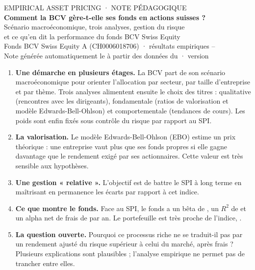 \documentclass[11pt,a4paper]{article}
\begin{document}
\begin{center}
  {\small\color{gris} EMPIRICAL ASSET PRICING · NOTE PÉDAGOGIQUE}\\[6pt]
  {\LARGE\bfseries Comment la BCV gère-t-elle ses fonds en actions suisses ?}\\[4pt]
  {\large Scénario macroéconomique, trois analyses, gestion du risque\\et ce qu'en dit la performance du fonds BCV Swiss Equity}\\[8pt]
  {\small Fonds BCV Swiss Equity A (CH0006018706) · résultats empiriques \PeriodeDebut{} – \PeriodeFin{}}\\[2pt]
  {\small\color{gris} Note générée automatiquement le \DateRapport{} à partir des données du \DateDonnees{} · version \texttt{\Commit}}
\end{center}

\vspace{4pt}

\begin{essentiel}
\begin{enumerate}[leftmargin=*,label=\textbf{\arabic*.}]
  \item \textbf{Une démarche en plusieurs étages.} La BCV part de son scénario macroéconomique pour orienter l'allocation par secteur, par taille d'entreprise et par thème. Trois analyses alimentent ensuite le choix des titres : qualitative (rencontres avec les dirigeants), fondamentale (ratios de valorisation et modèle Edwards-Bell-Ohlson) et comportementale (tendances de cours). Les poids sont enfin fixés sous contrôle du risque par rapport au SPI.
  \item \textbf{La valorisation.} Le modèle Edwards-Bell-Ohlson (EBO) estime un prix théorique : une entreprise vaut plus que ses fonds propres si elle gagne davantage que le rendement exigé par ses actionnaires. Cette valeur est très sensible aux hypothèses.
  \item \textbf{Une gestion « relative ».} L'objectif est de battre le SPI à long terme en maîtrisant en permanence les écarts par rapport à cet indice.
  \item \textbf{Ce que montre le fonds.} Face au SPI, le fonds a un bêta de \FdsBeta{}, un $R^2$ de \FdsRDeuxPct{} et un alpha net de frais de \FdsAlphaA{} par an. Le portefeuille est très proche de l'indice, \MomCourt{}.
  \item \textbf{La question ouverte.} Pourquoi ce processus riche ne se traduit-il pas par un rendement ajusté du risque supérieur à celui du marché, après frais ? Plusieurs explications sont plausibles ; l'analyse empirique ne permet pas de trancher entre elles.
\end{enumerate}
\end{essentiel}
\end{document}

